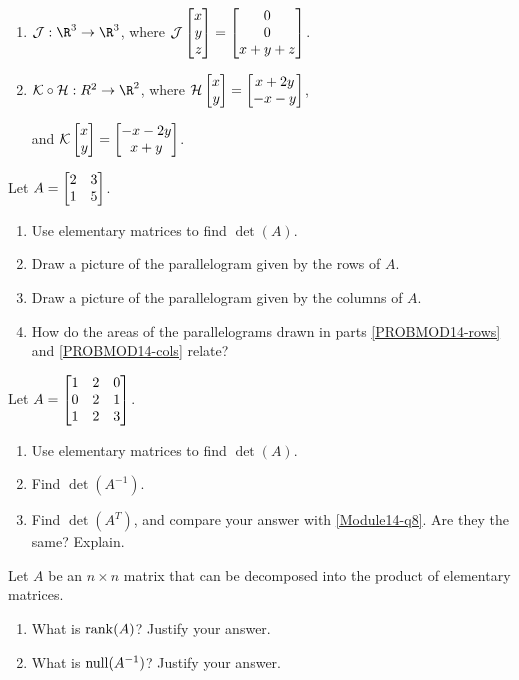 \begin{exercises}
\begin{problist}
\begin{enumerate}
			\item $\mathcal J:\R^{3}\to\R^{3}$, where
				$\mathcal J\mat{x\\y\\z}=\matc{0\\0\\x+y+z}$.

			\item $\mathcal K\circ \mathcal H:R^{2}\to\R^{2}$, where
				$\mathcal H\mat{x\\y}=\matc{x+2y\\-x-y}$,

				and $\mathcal K\mat{x\\y}=\matc{-x-2y\\x+y}$.
		\end{enumerate}

		\prob Let $A=\mat{2&3\\1&5}$.
		\begin{enumerate}
			\item Use elementary matrices to find $\det(A)$.

			\item Draw a picture of the parallelogram given by the rows
				of $A$. 
				\label{PROBMOD14-rows}

			\item Draw a picture of the parallelogram given by the columns
				of $A$.
				\label{PROBMOD14-cols}
			\item How do the areas of the parallelograms drawn in parts \ref{PROBMOD14-rows} and
				\ref{PROBMOD14-cols} relate?
		\end{enumerate}

		\prob Let $A=\mat{1&2&0\\0&2&1\\1&2&3}$.
		\begin{enumerate}
			\item \label{Module14-q8} Use elementary matrices to
				find $\det(A)$.

			\item Find $\det(A^{-1})$.

			\item Find $\det(A^{T})$, and compare your answer with
				\ref{Module14-q8}. Are they the same? Explain.
		\end{enumerate}

		\prob Let $A$ be an $n \times n$ matrix that can be decomposed into
		the product of elementary matrices.
		\begin{enumerate}
			\item What is $\operatorname{rank}(A)$? Justify your answer.

			\item What is $\operatorname{null}(A^{-1})$? Justify your answer.
		\end{enumerate}
	\end{problist}
\end{exercises}

